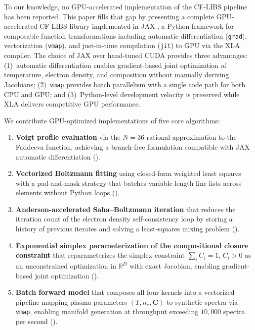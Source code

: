 To our knowledge, no GPU-accelerated implementation of the CF-LIBS pipeline has been reported.
This paper fills that gap by presenting a complete GPU-accelerated CF-LIBS library implemented in JAX \citep{Bradbury2018}, a Python framework for composable function transformations including automatic differentiation (\texttt{grad}), vectorization (\texttt{vmap}), and just-in-time compilation (\texttt{jit}) to GPU via the XLA compiler.
The choice of JAX over hand-tuned CUDA provides three advantages: (1)~automatic differentiation enables gradient-based joint optimization of temperature, electron density, and composition without manually deriving Jacobians; (2)~\texttt{vmap} provides batch parallelism with a single code path for both CPU and GPU; and (3)~Python-level development velocity is preserved while XLA delivers competitive GPU performance.

We contribute GPU-optimized implementations of five core algorithms:
\begin{enumerate}
  \item \textbf{Voigt profile evaluation} via the \citet{Weideman1994} $N=36$ rational approximation to the Faddeeva function, achieving a branch-free formulation compatible with JAX automatic differentiation ().
  \item \textbf{Vectorized Boltzmann fitting} using closed-form weighted least squares with a pad-and-mask strategy that batches variable-length line lists across elements without Python loops ().
  \item \textbf{Anderson-accelerated Saha--Boltzmann iteration} that reduces the iteration count of the electron density self-consistency loop by storing a history of previous iterates and solving a least-squares mixing problem \citep{Walker2011,Evans2018} ().
  \item \textbf{Exponential simplex parameterization of the compositional closure constraint} that reparameterizes the simplex constraint $\sum_i C_i = 1$, $C_i > 0$ as an unconstrained optimization in $\mathbb{R}^D$ with exact Jacobian, enabling gradient-based joint optimization ().
  \item \textbf{Batch forward model} that composes all four kernels into a vectorized pipeline mapping plasma parameters $(T, n_e, \bm{C})$ to synthetic spectra via \texttt{vmap}, enabling manifold generation at throughput exceeding $10{,}000$ spectra per second ().
\end{enumerate}

